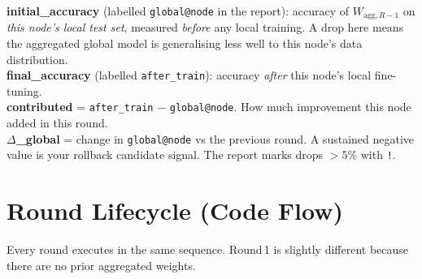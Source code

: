 \documentclass[11pt,a4paper]{article}
\newcommand{\Wagg}[1]{$W_{\text{agg},#1}$}
\begin{document}
\begin{tcolorbox}[infobox={What \texttt{initial\_accuracy} and \texttt{final\_accuracy} mean}]
  \textbf{initial\_accuracy} (labelled \texttt{global@node} in the report):
  accuracy of \Wagg{R-1} on \emph{this node's local test set},
  measured \textit{before} any local training.
  A drop here means the aggregated global model is generalising
  less well to this node's data distribution.\\[4pt]
  \textbf{final\_accuracy} (labelled \texttt{after\_train}):
  accuracy \textit{after} this node's local fine-tuning.\\[4pt]
  \textbf{contributed} = \texttt{after\_train} $-$ \texttt{global@node}.
  How much improvement this node added in this round.\\[4pt]
  \textbf{$\Delta$\_global} = change in \texttt{global@node} vs the
  previous round.  A sustained negative value is your rollback candidate
  signal.  The report marks drops $> 5\%$ with \texttt{!}.
\end{tcolorbox}

\newpage
\section{Round Lifecycle (Code Flow)}
\label{sec:lifecycle}

Every round executes in the same sequence.  Round\,1 is slightly different
because there are no prior aggregated weights.
\end{document}
